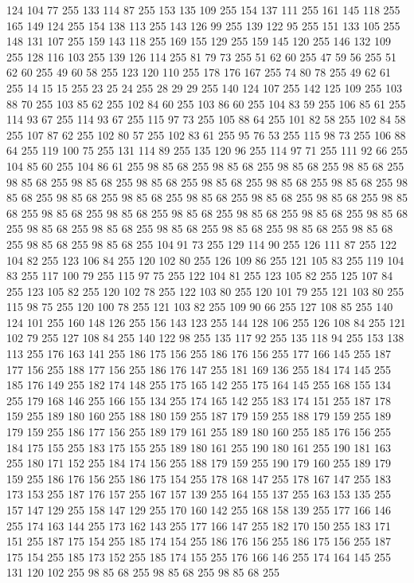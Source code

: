 124 104 77 255 133 114 87 255 153 135 109 255 154 137 111 255 161 145 118 255 165 149 124 255 154 138 113 255 143 126 99 255 139 122 95 255 151 133 105 255 148 131 107 255 159 143 118 255 169 155 129 255 159 145 120 255 146 132 109 255 128 116 103 255 139 126 114 255 81 79 73 255 51 62 60 255 47 59 56 255 51 62 60 255 49 60 58 255 123 120 110 255 178 176 167 255 74 80 78 255 49 62 61 255 14 15 15 255 23 25 24 255 28 29 29 255 140 124 107 255 142 125 109 255 103 88 70 255 103 85 62 255 102 84 60 255 103 86 60 255 104 83 59 255 106 85 61 255 114 93 67 255 114 93 67 255 115 97 73 255 105 88 64 255 101 82 58 255 102 84 58 255 107 87 62 255 102 80 57 255 102 83 61 255 95 76 53 255 115 98 73 255 106 88 64 255 119 100 75 255 131 114 89 255 135 120 96 255 114 97 71 255 111 92 66 255 104 85 60 255 104 86 61 255 98 85 68 255 98 85 68 255 98 85 68 255 98 85 68 255 98 85 68 255 98 85 68 255 98 85 68 255 98 85 68 255
98 85 68 255 98 85 68 255 98 85 68 255 98 85 68 255 98 85 68 255 98 85 68 255 98 85 68 255 98 85 68 255 98 85 68 255 98 85 68 255 98 85 68 255 98 85 68 255 98 85 68 255 98 85 68 255 98 85 68 255 98 85 68 255 98 85 68 255 98 85 68 255 98 85 68 255 98 85 68 255 98 85 68 255 98 85 68 255 98 85 68 255 104 91 73 255 129 114 90 255 126 111 87 255 122 104 82 255 123 106 84 255 120 102 80 255 126 109 86 255 121 105 83 255 119 104 83 255 117 100 79 255 115 97 75 255 122 104 81 255 123 105 82 255 125 107 84 255 123 105 82 255 120 102 78 255 122 103 80 255 120 101 79 255 121 103 80 255 115 98 75 255 120 100 78 255 121 103 82 255 109 90 66 255 127 108 85 255 140 124 101 255 160 148 126 255 156 143 123 255 144 128 106 255 126 108 84 255 121 102 79 255 127 108 84 255 140 122 98 255 135 117 92 255 135 118 94 255 153 138 113 255 176 163 141 255 186 175 156 255 186 176 156 255 177 166 145 255 187 177 156 255 188 177 156 255
186 176 147 255 181 169 136 255 184 174 145 255 185 176 149 255 182 174 148 255 175 165 142 255 175 164 145 255 168 155 134 255 179 168 146 255 166 155 134 255 174 165 142 255 183 174 151 255 187 178 159 255 189 180 160 255 188 180 159 255 187 179 159 255 188 179 159 255 189 179 159 255 186 177 156 255 189 179 161 255 189 180 160 255 185 176 156 255 184 175 155 255 183 175 155 255 189 180 161 255 190 180 161 255 190 181 163 255 180 171 152 255 184 174 156 255 188 179 159 255 190 179 160 255 189 179 159 255 186 176 156 255 186 175 154 255 178 168 147 255 178 167 147 255 183 173 153 255 187 176 157 255 167 157 139 255 164 155 137 255 163 153 135 255 157 147 129 255 158 147 129 255 170 160 142 255 168 158 139 255 177 166 146 255 174 163 144 255 173 162 143 255 177 166 147 255 182 170 150 255 183 171 151 255 187 175 154 255 185 174 154 255 186 176 156 255 186 175 156 255 187 175 154 255 185 173 152 255 185 174 155 255 176 166 146 255 174 164 145 255 131 120 102 255 98 85 68 255 98 85 68 255 98 85 68 255
